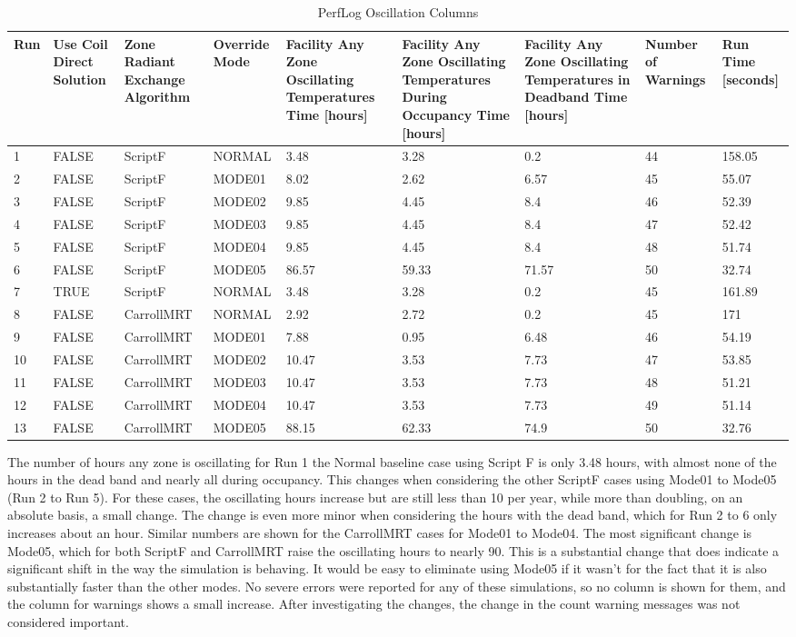 {\scriptsize
\begin{longtable}[c]{p{0.3in}p{0.75in}p{0.75in}p{0.75in}p{0.5in}p{0.5in}p{0.75in}p{0.75in}p{0.75in}}
\caption{PerfLog Oscillation Columns\label{table:perflog_mode_columns}} \tabularnewline
\toprule
Run &
  Use Coil Direct Solution &
  Zone Radiant Exchange Algorithm &
  Override Mode &
  Facility Any Zone Oscillating Temperatures Time {[}hours{]} &
  Facility Any Zone Oscillating Temperatures During Occupancy Time {[}hours{]} &
  Facility Any Zone Oscillating Temperatures in Deadband Time {[}hours{]} &
  Number of Warnings &
  Run Time {[}seconds{]} \tabularnewline
\midrule
\endfirsthead
1  & FALSE & ScriptF    & NORMAL & 3.48  & 3.28  & 0.2   & 44 & 158.05 \tabularnewline
2  & FALSE & ScriptF    & MODE01 & 8.02  & 2.62  & 6.57  & 45 & 55.07  \tabularnewline
3  & FALSE & ScriptF    & MODE02 & 9.85  & 4.45  & 8.4   & 46 & 52.39  \tabularnewline
4  & FALSE & ScriptF    & MODE03 & 9.85  & 4.45  & 8.4   & 47 & 52.42  \tabularnewline
5  & FALSE & ScriptF    & MODE04 & 9.85  & 4.45  & 8.4   & 48 & 51.74  \tabularnewline
6  & FALSE & ScriptF    & MODE05 & 86.57 & 59.33 & 71.57 & 50 & 32.74  \tabularnewline
7  & TRUE  & ScriptF    & NORMAL & 3.48  & 3.28  & 0.2   & 45 & 161.89 \tabularnewline
8  & FALSE & CarrollMRT & NORMAL & 2.92  & 2.72  & 0.2   & 45 & 171    \tabularnewline
9  & FALSE & CarrollMRT & MODE01 & 7.88  & 0.95  & 6.48  & 46 & 54.19  \tabularnewline
10 & FALSE & CarrollMRT & MODE02 & 10.47 & 3.53  & 7.73  & 47 & 53.85  \tabularnewline
11 & FALSE & CarrollMRT & MODE03 & 10.47 & 3.53  & 7.73  & 48 & 51.21  \tabularnewline
12 & FALSE & CarrollMRT & MODE04 & 10.47 & 3.53  & 7.73  & 49 & 51.14  \tabularnewline
13 & FALSE & CarrollMRT & MODE05 & 88.15 & 62.33 & 74.9  & 50 & 32.76  \tabularnewline
\bottomrule
\end{longtable}
}

The number of hours any zone is oscillating for Run 1 the Normal baseline case using Script F is only 3.48 hours, with almost none of the hours in the dead band and nearly all during occupancy. This changes when considering the other ScriptF cases using Mode01 to Mode05 (Run 2 to Run 5).  For these cases, the oscillating hours increase but are still less than 10 per year, while more than doubling, on an absolute basis, a small change. The change is even more minor when considering the hours with the dead band, which for Run 2 to 6 only increases about an hour. Similar numbers are shown for the CarrollMRT cases for Mode01 to Mode04. The most significant change is Mode05, which for both ScriptF and CarrollMRT raise the oscillating hours to nearly 90. This is a substantial change that does indicate a significant shift in the way the simulation is behaving. It would be easy to eliminate using Mode05 if it wasn’t for the fact that it is also substantially faster than the other modes. No severe errors were reported for any of these simulations, so no column is shown for them, and the column for warnings shows a small increase. After investigating the changes, the change in the count warning messages was not considered important.

